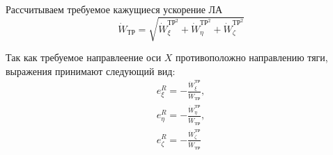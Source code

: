 Рассчитываем требуемое кажущиеся ускорение ЛА
\begin{equation}
	\dot{W}_\text{ТР} = \sqrt{ \dot{W}^{\text{ТР}^2}_\xi + \dot{W}^{\text{ТР}^2}_\eta +\dot{W}^{\text{ТР}^2}_\zeta }
\end{equation}

Так как требуемое направлеение оси $X$ противоположно направлению тяги, выражения принимают следующий вид:
\begin{equation}
	\begin{gathered}
		e^R_\xi = - \frac{\dot{W}^\text{ТР}_\xi}{\dot{W}_\text{ТР}}, \\
		e^R_\eta = - \frac{\dot{W}^\text{ТР}_\eta}{\dot{W}_\text{ТР}}, \\
		e^R_\zeta = - \frac{\dot{W}^\text{ТР}_\zeta}{\dot{W}_\text{ТР}} \\
	\end{gathered}
\end{equation}
\clearpage
